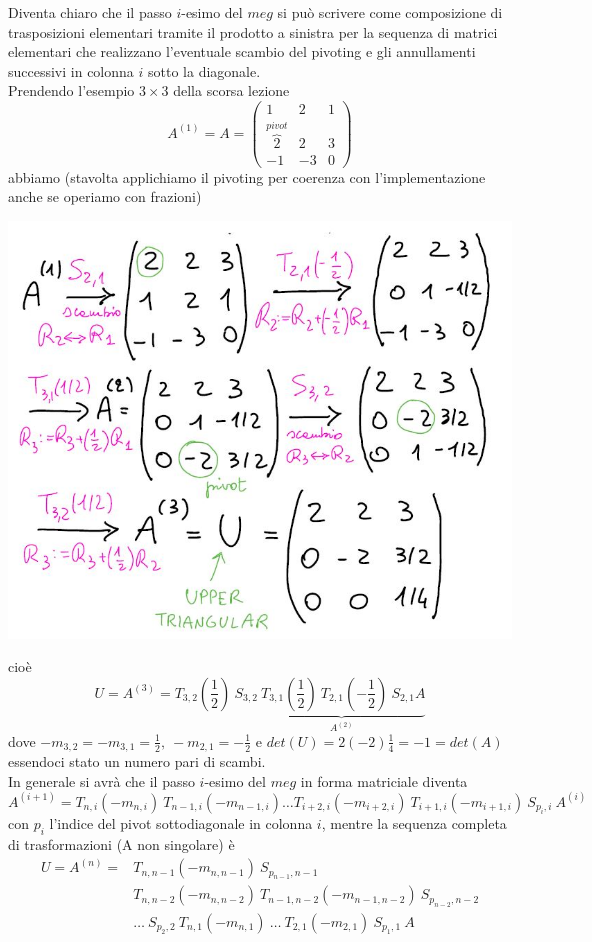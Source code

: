 \documentclass[12pt,a4paper]{article}
\begin{document}
Diventa chiaro che il passo $i$-esimo del $meg$ si può scrivere come composizione di trasposizioni elementari tramite il prodotto a sinistra per la sequenza di matrici elementari che realizzano l'eventuale scambio del pivoting e gli annullamenti successivi in colonna $i$ sotto la diagonale.\\Prendendo l'esempio $3\times 3$ della scorsa lezione
\begin{equation*}
    A^{(1)}=A=\begin{pmatrix}
        1 & 2 & 1 \\
        \overbrace{2}^{pivot} & 2 & 3 \\
        -1 & -3 & 0
        \end{pmatrix}
\end{equation*}
abbiamo (stavolta applichiamo il pivoting per coerenza con l'implementazione anche se operiamo con frazioni)
\begin{center}
    \includegraphics[scale=0.5]{lez22_pag11.JPG}    
\end{center}
cioè
\[
U = A^{(3)} = T_{3,2} \left(\frac{1}{2}\right) \ S_{3,2} \underbrace{\ T_{3,1} \left(\frac{1}{2}\right) \ T_{2,1} \left(-\frac{1}{2}\right) \ S_{2,1} A}_{A^{(2)}}
\]
dove $-m_{3,2} = -m_{3,1} = \frac{1}{2}, \ -m_{2,1} = -\frac{1}{2}$ e $det(U) = 2(-2)\frac{1}{4} = -1 = det(A)$ essendoci stato un numero pari di scambi.\\
In generale si avrà che il passo $i$-esimo del $meg$ in forma matriciale diventa
\[
    A^{(i+1)} = T_{n,i} (-m_{n, i}) \ T_{n-1, i} (-m_{n-1, i}) \dotso T_{i+2, i} (-m_{i+2, i})\ T_{i+1, i} (-m_{i+1, i}) \ S_{p_i, i} \ A^{(i)}
\]
con $p_i$ l'indice del pivot sottodiagonale in colonna $i$, mentre la sequenza completa di trasformazioni (A non singolare) è
\begin{align*}
    U = A^{(n)} = & T_{n, n-1} (-m_{n, n-1}) \ S_{p_{n-1}, n-1} \\
    & T_{n, n-2} (-m_{n, n-2}) \ T_{n-1, n-2} (-m_{n-1, n-2}) \ S_{p_{n-2}, n-2} \\
    & \dotso \ S_{p_2, 2} \ T_{n,1} (-m_{n,1}) \ \dotso \ T_{2,1} (-m_{2,1}) \ S_{p_1, 1} \ A
\end{align*}
\end{document}
